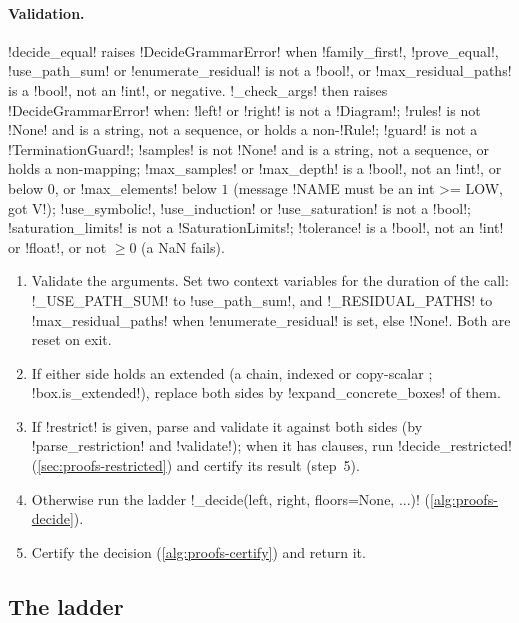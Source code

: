 \paragraph{Validation.} \py!decide_equal! raises \py!DecideGrammarError! when \py!family_first!, \py!prove_equal!, \py!use_path_sum! or \py!enumerate_residual! is not a \py!bool!, or \py!max_residual_paths! is a \py!bool!, not an \py!int!, or negative. \py!_check_args! then raises \py!DecideGrammarError! when: \py!left! or \py!right! is not a \py!Diagram!; \py!rules! is not \py!None! and is a string, not a sequence, or holds a non-\py!Rule!; \py!guard! is not a \py!TerminationGuard!; \py!samples! is not \py!None! and is a string, not a sequence, or holds a non-mapping; \py!max_samples! or \py!max_depth! is a \py!bool!, not an \py!int!, or below $0$, or \py!max_elements! below $1$ (message \code!NAME must be an int >= LOW, got V!); \py!use_symbolic!, \py!use_induction! or \py!use_saturation! is not a \py!bool!; \py!saturation_limits! is not a \py!SaturationLimits!; \py!tolerance! is a \py!bool!, not an \py!int! or \py!float!, or not $\ge0$ (a NaN fails).

\begin{algorithm}\label{alg:proofs-decide-top}
\leavevmode
\begin{enumerate}
\item Validate the arguments. Set two context variables for the duration of the call: \py!_USE_PATH_SUM! to \py!use_path_sum!, and \py!_RESIDUAL_PATHS! to \py!max_residual_paths! when \py!enumerate_residual! is set, else \py!None!. Both are reset on exit.
\item If either side holds an extended \bbox{} (a chain, indexed or copy-scalar \bbox; \py!box.is_extended!), replace both sides by \py!expand_concrete_boxes! of them.
\item If \py!restrict! is given, parse and validate it against both sides (by \py!parse_restriction! and \py!validate!); when it has clauses, run \py!decide_restricted! (\cref{sec:proofs-restricted}) and certify its result (step~5).
\item Otherwise run the ladder \py!_decide(left, right, floors=None, ...)! (\cref{alg:proofs-decide}).
\item Certify the decision (\cref{alg:proofs-certify}) and return it.
\end{enumerate}
\end{algorithm}

\subsection{The ladder}

